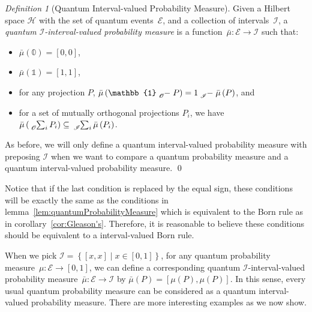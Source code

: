 \documentclass{article}
\theoremstyle{remark}
\newtheorem{definition}{Definition}
\newcommand{\events}{\ensuremath{\mathcal{E}}}
\newcommand{\Hilb}{\mathcal{H}}
\begin{document}
\begin{definition}[Quantum Interval-valued Probability Measure]\label{def:QuantumInterval-valuedProbability}
Given a Hilbert space $\Hilb$ with the set of quantum events~$\events$,
and a collection of intervals~$\mathscr{I}$, a \emph{quantum $\mathscr{I}$-interval-valued
probability measure} is a function~$\bar{\mu}:\events\rightarrow\mathscr{I}$
such that: 
\begin{itemize}
\item $\bar{\mu}(\mathbb{0})=\left[0,0\right]$, 
\item $\bar{\mu}(\mathbb{1})=\left[1,1\right]$, 
\item for any projection $P$,
$\bar{\mu}\left(\mathbb{1}\tensor*[_{\mathscr{O}}]{-}{}P\right)=1\tensor*[_{\mathscr{I}}]{-}{}\bar{\mu}\left(P\right)$, and
\item for a set of mutually orthogonal projections $P_{i}$, we have
$\bar{\mu}\left(\tensor*[_{\mathscr{O}}]{\sum}{_{i}}P_{i}\right)\subseteq\tensor*[_{\mathscr{I}}]{\sum}{_{i}}\bar{\mu}\left(P_{i}\right)$.
\end{itemize}
As before, we will only define a quantum interval-valued probability measure
with preposing $\mathscr{I}$ when we want to compare a quantum probability
measure and a quantum interval-valued probability measure.
\qed\end{definition}

Notice that if the last condition is replaced by the equal sign, these
conditions will be exactly the same as the conditions in lemma~\ref{lem:quantumProbabilityMeasure}
which is equivalent to the Born rule as in corollary~\ref{cor:Gleason's}.
Therefore, it is reasonable to believe these conditions should be
equivalent to a interval-valued Born rule. 

When we pick $\mathscr{I}=\left\{ \left[x,x\right]\middle|x\in\left[0,1\right]\right\} $,
for any quantum probability measure~$\mu:\events\rightarrow\left[0,1\right]$,
we can define a corresponding quantum \emph{$\mathscr{I}$}-interval-valued
probability measure~$\bar{\mu}:\events\rightarrow\mathscr{I}$
by $\bar{\mu}\left(P\right)=\left[\mu\left(P\right),\mu\left(P\right)\right]$.
In this sense, every usual quantum probability measure can be considered
as a quantum interval-valued probability measure. There are more interesting
examples as we now show.
\end{document}
